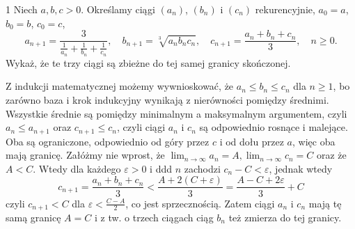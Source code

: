 \documentclass{../note}
\begin{document}
\begin{zadanie}{1}
Niech $a, b, c>0$. Określamy ciągi $(a_n)$, $(b_n)$ i $(c_n)$ rekurencyjnie, $a_{0}=a$, $b_{0}=b$, $c_{0}=c$,
\[ a_{n+1}=\frac{3}{\frac{1}{a_{n}}+\frac{1}{b_{n}}+\frac{1}{c_{n}}}, \quad b_{n+1}=\sqrt[3]{a_{n}b_{n}c_{n}}, \quad c_{n+1}=\frac{a_{n}+b_{n}+c_{n}}{3}, \quad n \ge 0. \]
Wykaż, że te trzy ciągi są zbieżne do tej samej granicy skończonej.
\end{zadanie}
\begin{rozwiazanie}
Z indukcji matematycznej możemy wywnioskować, że $a_n \leq b_n \leq c_n$ dla $n \geq 1$, bo zarówno baza i krok indukcyjny wynikają z nierówności pomiędzy średnimi. Wszystkie średnie są pomiędzy minimalnym a maksymalnym argumentem, czyli $a_n \leq a_{n+1}$ oraz $c_{n+1} \leq c_n$, czyli ciągi $a_n$ i $c_n$ są odpowiednio rosnące i malejące. Oba są ograniczone, odpowiednio od góry przez $c$ i od dołu przez $a$, więc oba mają granicę. Załóżmy nie wprost, że $\lim_{n\rightarrow\infty} a_n = A, \lim_{n\rightarrow\infty} c_n = C$ oraz że $A < C$. Wtedy dla każdego $\varepsilon > 0$ i ddd $n$ zachodzi $c_n - C < \varepsilon$, jednak wtedy 
\[c_{n+1} = \frac{a_{n}+b_{n}+c_{n}}{3} < \frac{A+2(C + \varepsilon)}{3} = \frac{A-C+2\varepsilon}{3}+ C\]
czyli $c_{n+1} < C$ dla $\varepsilon < \frac{C - A}{2}$, co jest sprzecznością. Zatem ciągi $a_n$ i $c_n$ mają tę samą granicę $A = C$ i z tw. o trzech ciągach ciąg $b_n$ też zmierza do tej granicy.
\end{rozwiazanie}
\end{document}
